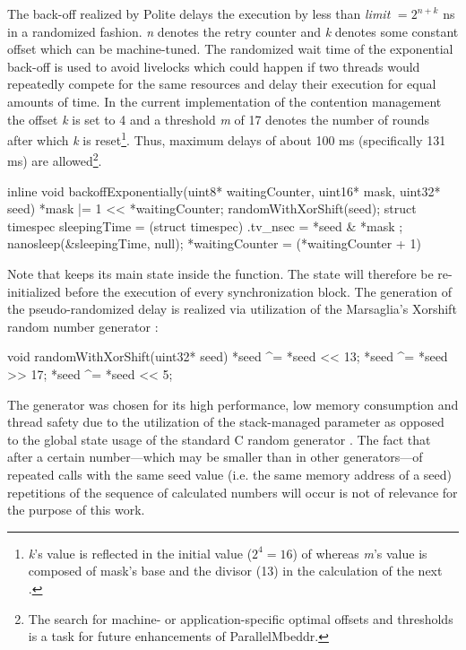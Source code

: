 The back-off realized by Polite delays the execution  by less than \textit{limit} $ = 2^{n+k}$ ns \cite{AdvancedContentionManagement} in a randomized fashion. \textit{n} denotes the retry counter and \textit{k} denotes some constant offset which can be machine-tuned. The randomized wait time of the exponential back-off is used to avoid livelocks which could happen if two threads would repeatedly compete for the same resources and delay their execution for equal amounts of time. In the current implementation  of the contention management the offset \textit{k} is set to 4 and a threshold \textit{m} of 17 denotes the number of rounds after which \textit{k} is reset\footnote{\textit{k}'s value is reflected in the initial value ($2^4 = 16$) of  whereas \textit{m}'s value is composed of mask's base and the divisor (13) in the calculation of the next .}. Thus, maximum delays of about 100 ms (specifically 131 ms) are allowed\footnote{The search for machine- or application-specific optimal offsets and thresholds is a task for future enhancements of ParallelMbeddr.}. 
\begin{ccode}
inline void backoffExponentially(uint8* waitingCounter, uint16* mask, uint32* seed) { 
  *mask |= 1 << *waitingCounter; 
  randomWithXorShift(seed); 
  struct timespec sleepingTime = (struct timespec){ .tv_nsec = *seed & *mask }; 
  nanosleep(&sleepingTime, null); 
  *waitingCounter = (*waitingCounter + 1) %
}
\end{ccode}
Note that  keeps its main state inside the  function. The state will therefore be re-initialized before the execution of every synchronization block. The generation of the pseudo-randomized delay is realized via utilization of the Marsaglia's Xorshift random number generator \cite{XorshiftRngs}:
\begin{ccode}
void randomWithXorShift(uint32* seed) { 
  *seed ^= *seed << 13; 
  *seed ^= *seed >> 17; 
  *seed ^= *seed << 5; 
}
\end{ccode}
The generator was chosen for its high performance, low memory consumption and thread safety due to the utilization of the stack-managed  parameter as opposed to the global state usage of the standard C random generator . The fact that after a certain number---which may be smaller than in other generators---of repeated calls with the same seed value (i.e. the same memory address of a seed) repetitions of the sequence of calculated numbers will occur is not of relevance for the purpose of this work.

